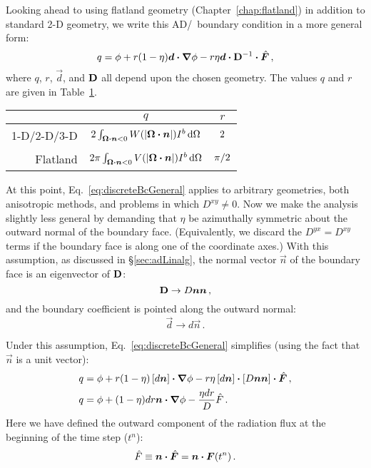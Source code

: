 Looking ahead to using flatland geometry (Chapter~\ref{chap:flatland}) in
addition to standard 2-D geometry, we write this
AD/\APone\ boundary condition in a more general form:
\begin{equation}\label{eq:discreteBcGeneral}
  q = \phi + r (1 - \eta) \bm{d} \bm{\cdot} \bm{\nabla} \phi
  - r \eta \bm{d} \bm{\cdot} \mathbf{D}^{-1} \bm{\cdot} \hat{\bm{F}}\,,
\end{equation}
where $q$, $r$, $\vec{d}$, and $\mathbf{D}$ all depend upon the chosen geometry. The
values $q$ and $r$ are given in Table~\ref{tab:discreteBcCoeffs}.
%
\begin{table}[htb]
  \centering
  \begin{tabular}{rcc}
\toprule
& $q$
& $r$
\\ \midrule
1-D/2-D/3-D
& $2 \int_{\bm{\Omega}\bm{\cdot}\bm{n} < 0}
  W(\left| \bm{\Omega}\bm{\cdot}\bm{n} \right|) I^b \mathop{}\!\mathrm{d}\Omega$
  & $2\vphantom{\Big|}$
\\
Flatland
& $2 \pi \int_{\bm{\Omega}\bm{\cdot}\bm{n} < 0}
  V(\left| \bm{\Omega}\bm{\cdot}\bm{n} \right|) I^b \mathop{}\!\mathrm{d}\Omega$
& $\pi/2\vphantom{\Big|}$
\\ \bottomrule
  \end{tabular}
  \label{tab:discreteBcCoeffs}
\end{table}

At this point, Eq.~\eqref{eq:discreteBcGeneral} applies to arbitrary geometries,
both anisotropic methods, and problems in which $D^{xy} \ne 0$.
Now we make the analysis slightly less general by demanding
that $\eta$ be azimuthally symmetric about the outward normal of the boundary face.
(Equivalently, we discard the $D^{yx}=D^{xy}$ terms if the boundary face is
along one of the coordinate axes.) With this assumption, as discussed in
\S\ref{sec:adLinalg}, the normal vector $\vec{n}$ of the boundary face is an
eigenvector of $\mathbf{D}$:
\begin{equation*}
  \mathbf{D} \to D \bm{n}\bm{n}\,,
\end{equation*}
and the boundary coefficient is pointed along the outward normal:
\begin{equation*}
  \vec{d} \to d \vec{n}\,.
\end{equation*}

Under this assumption, Eq.~\eqref{eq:discreteBcGeneral} simplifies
(using the fact that $\vec{n}$ is a unit vector):
\begin{align} \nonumber
  q &= \phi + r (1 - \eta) \left[ d \bm{n} \right] \bm{\cdot} \bm{\nabla} \phi
  - r \eta \left[ d \bm{n} \right] \bm{\cdot} \left[ D \bm{n}\bm{n} \right] \bm{\cdot}
  \hat{\bm{F}}\,,
  \\ \label{eq:discreteBcGeneralQ}
 q &=  \phi + (1 - \eta) dr \bm{n} \bm{\cdot} \bm{\nabla} \phi
  - \frac{\eta dr}{D} \hat{F} \,.
\end{align}
Here we have defined the outward component of the radiation flux at the
beginning of the time step ($t^n$):
\begin{equation*}
  \hat{F} \equiv  \bm{n} \bm{\cdot} \hat{\bm{F}} = \bm{n} \bm{\cdot} \bm{F}(t^n)\,.
\end{equation*}

